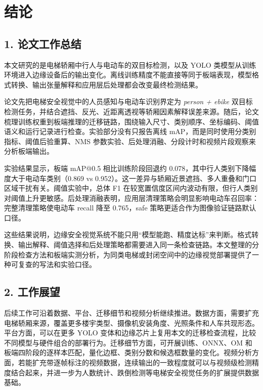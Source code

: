 \chapter{结论}
\label{cha:conclusion}

\section*{1. 论文工作总结}

本文研究的是电梯轿厢中行人与电动车的双目标检测，以及 YOLO 类模型从训练环境进入边缘设备后的输出变化。离线训练精度不能直接等同于板端表现，模型格式转换、输出张量解释和应用层后处理都会改变最终检测结果。

论文先把电梯安全视觉中的人员感知与电动车识别界定为 \textit{person + ebike} 双目标检测任务，并结合遮挡、反光、近距离透视等轿厢因素解释误差来源。随后，论文梳理训练权重到板端推理的迁移链路，围绕输入尺寸、类别顺序、坐标编码、阈值语义和运行记录进行检查。实验部分没有只报告离线 mAP，而是同时使用分类别指标、阈值后验重算、NMS 参数实验、后处理消融、分段计时和视频片段观察来分析板端输出。

实验结果显示，板端 mAP@0.5 相比训练阶段回退约 0.078，其中行人类别下降幅度大于电动车类别（0.869 vs 0.952）。这一差异与轿厢近景遮挡、多人重叠和门口区域干扰有关。阈值实验中，总体 F1 在较宽置信度区间内波动有限，但行人类别对阈值上升更敏感。后处理消融表明，应用层清理策略会明显影响电动车召回率：完整清理策略使电动车 recall 降至 0.765，safe 策略更适合作为图像验证链路默认口径。

这些结果说明，边缘安全视觉系统不能只用“模型能跑、精度达标”来判断。格式转换、输出解释、阈值选择和后处理策略都需要进入同一条检查链路。本文整理的分阶段检查方法和板端实测分析，为同类电梯或封闭空间中的边缘视觉部署提供了一种可复查的写法和实验口径。

\section*{2. 工作展望}

后续工作可沿着数据、平台、迁移细节和视频分析继续推进。数据方面，需要扩充电梯轿厢来源，覆盖更多楼宇类型、摄像机安装角度、光照条件和人车共现形态。平台方面，可以在更多 YOLO 变体和边缘芯片上复用本文的迁移检查流程，比较不同模型与硬件组合的部署行为。迁移细节方面，可开展训练、ONNX、OM 和板端四阶段的逐样本匹配，量化边框、类别分数和候选框数量的变化。视频分析方面，若能扩充带逐帧标注的视频数据，连续输出的一致程度就可以与视频级检测精度结合起来，并进一步为人数统计、跌倒检测等电梯安全视觉任务的扩展提供数据基础。
